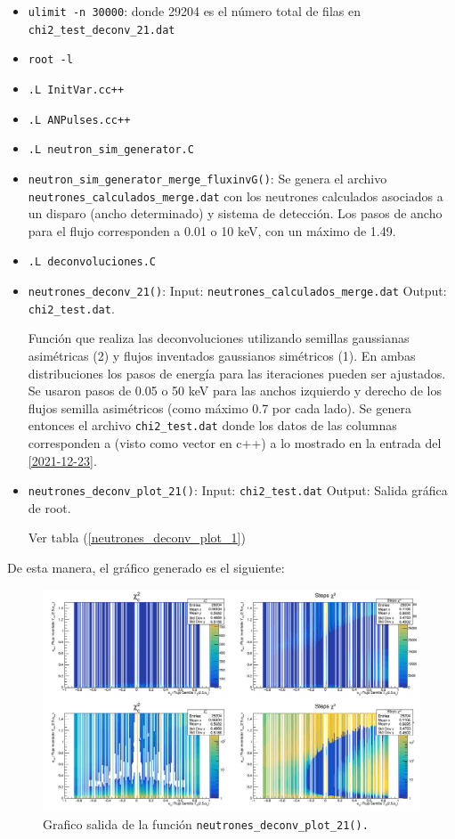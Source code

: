 \documentclass[11pt,letterpaper]{article}
\begin{document}
\begin{itemize}
\item \verb|ulimit -n 30000|: donde 29204 es el número total de filas en \verb|chi2_test_deconv_21.dat|
\item \verb|root -l|
\item \verb|.L InitVar.cc++|
\item \verb|.L ANPulses.cc++|
\item \verb|.L neutron_sim_generator.C|
\item \verb|neutron_sim_generator_merge_fluxinvG()|: Se genera el archivo \verb|neutrones_calculados_merge.dat| con los neutrones calculados asociados a un disparo (ancho determinado) y sistema de detección. Los pasos de ancho para el flujo corresponden a 0.01 o 10 keV, con un máximo de 1.49.
\item \verb|.L deconvoluciones.C|
\item \verb|neutrones_deconv_21()|: 
Input: \verb|neutrones_calculados_merge.dat| Output:  \verb|chi2_test.dat|.

Función que realiza las deconvoluciones utilizando semillas gaussianas asimétricas (2) y flujos inventados gaussianos simétricos (1). En ambas distribuciones los pasos de energía para las iteraciones pueden ser ajustados. Se usaron pasos de 0.05 o 50 keV para las anchos izquierdo y derecho de los flujos semilla asimétricos (como máximo 0.7 por cada lado). Se genera entonces el archivo \verb|chi2_test.dat| donde los datos de las columnas corresponden a (visto como vector en c++) a lo mostrado en la entrada del \ref{2021-12-23}.
\item \verb|neutrones_deconv_plot_21()|: Input: \verb|chi2_test.dat| Output: Salida gráfica de root.

Ver tabla (\ref{neutrones_deconv_plot_1})
\end{itemize}

De esta manera, el gráfico generado es el siguiente:

\begin{figure}[H]
    \includegraphics[width=1.\textwidth]{img/plot_deconv_21_fail_01.png}
    \centering
     \cprotect\caption{Grafico salida de la función \verb|neutrones_deconv_plot_21().|} 
\label{neutrones_deconv_plot_21_fail}
\end{figure}
\end{document}
